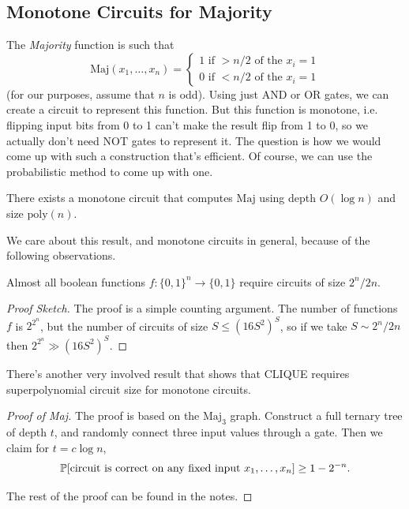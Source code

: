 \documentclass[11 pt]{scrartcl}
\newcommand{\Maj}{\text{Maj}}
\newcommand{\poly}{\text{poly}}
\begin{document}
\subsection{Monotone Circuits for Majority}

The \emph{Majority} function is such that 
\[ \Maj(x_1, \dots, x_n) = \begin{cases} 1 \text{ if } > n/2 \text{ of the }x_i = 1 \\ 0 \text{ if } < n/2 \text{ of the }x_i = 1 \end{cases}\] 
(for our purposes, assume that $n$ is odd). Using just AND or OR gates, we can create a circuit to represent this function. But this function is monotone, i.e. flipping input bits from 0 to 1 can't make the result flip from 1 to 0, so we actually don't need NOT gates to represent it. The question is how we would come up with such a construction that's efficient. Of course, we can use the probabilistic method to come up with one. 

\begin{theorem}
    There exists a monotone circuit that computes $\Maj$ using depth $O(\log n)$ and size $\poly(n)$.  
\end{theorem}

We care about this result, and monotone circuits in general, because of the following observations. 
\begin{fact}
    Almost all boolean functions $f: \{0,1\}^n \to \{0,1\}$ require circuits of size $2^n / 2n$. 
\end{fact}
\begin{proof}[Proof Sketch]
    The proof is a simple counting argument. The number of functions $f$ is $2^{2^n}$, but the number of circuits of size $S \leq (16S^2)^S$, so if we take $S \sim 2^n/2n$ then $2^{2^n} \gg (16S^2)^S$. 
\end{proof}

There's another very involved result that shows that CLIQUE requires superpolynomial circuit size for monotone circuits. 

\begin{proof}[Proof of Maj]
    The proof is based on the $\Maj_3$ graph. Construct a full ternary tree of depth $t$, and randomly connect three input values through a gate. Then we claim for $t = c\log n$, 
    \[ \mathbb P[\text{circuit is correct on any fixed input }x_1, \dots, x_n] \geq 1-2^{-n}.\]

The rest of the proof can be found in the notes.     
\end{proof}
\end{document}
